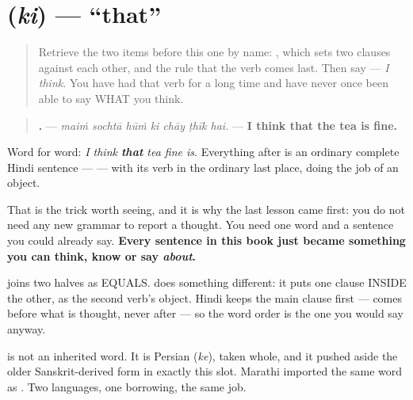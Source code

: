 \section[\texorpdfstring{\hi{कि} (ki)}{कि (ki)}]{ (\emph{ki}) — \textquotedblleft{}that\textquotedblright{}}

\label{lesson:HI-C69-ki}



\begin{quote}
Retrieve the two items before this one by name: \textbf{}, which sets two clauses against each other, and the rule that the verb comes last. Then say \textbf{  } — \emph{I think}. You have had that verb for a long time and have never once been able to say WHAT you think.
\end{quote}

\begin{grammarlens}[title={Grammar Lens: \hi{कि} opens the room the thought goes into}]
\begin{quote}
\textbf{      .} — \emph{maiṁ sochtā hūṁ ki chāy ṭhīk hai.} — \textbf{I think that the tea is fine.}
\end{quote}

Word for word: \emph{I think \textbf{that} tea fine is}. Everything after \textbf{} is an ordinary complete Hindi sentence — \textbf{  } — with its verb in the ordinary last place, doing the job of an object.

That is the trick worth seeing, and it is why the last lesson came first: you do not need any new grammar to report a thought. You need one word and a sentence you could already say. \textbf{Every sentence in this book just became something you can think, know or say \emph{about}.}

\textbf{} joins two halves as EQUALS. \textbf{} does something different: it puts one clause INSIDE the other, as the second verb's object. Hindi keeps the main clause first — \textbf{ } comes before what is thought, never after — so the word order is the one you would say anyway.

\textbf{} is not an inherited word. It is Persian \textbf{} (\emph{ke}), taken whole, and it pushed aside the older Sanskrit-derived form in exactly this slot. Marathi imported the same word as \textbf{}. Two languages, one borrowing, the same job.
\end{grammarlens}

